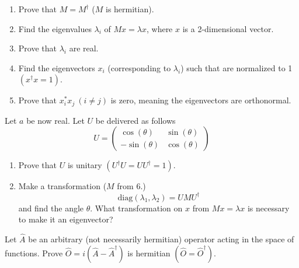 \documentclass[11pt,letterpaper]{article}%
\begin{document}
\begin{enumerate}[label=\Large{\textbf{\arabic*.}}]
{\begin{enumerate}[label=\textit{\roman*.}]
\item{
Prove that $M = M^\dag$ ($M$ is hermitian).
}

\item{
Find the eigenvalues $\lambda_i$ of $Mx=\lambda x$, where $x$ is a 2-dimensional vector.
}

\item{
Prove that $\lambda_i$ are real.
}

\item{
Find the eigenvectors $x_i$ (corresponding to $\lambda_i$) such that are normalized to 1 $(x^\dag 
x = 1)$.
}

\item{
Prove that $x_i^*x_j\ (i\neq j)$ is zero, meaning the eigenvectors are orthonormal.
}

\end{enumerate}

\item{
Let $a$ be now real. Let $U$ be delivered as follows
\begin{equation}
\label{U}
U =
\begin{pmatrix}
\cos(\theta) & \sin(\theta)\\
-\sin(\theta) & \cos(\theta)
\end{pmatrix}
\end{equation}

\begin{enumerate}[label=\textit{\roman*.}]
\item{
Prove that $U$ is unitary $(U^\dag U = UU^\dag = 1)$.
}

\item{
Make a transformation ($M$ from 6.)
\begin{equation}
\label{transform}
\text{diag}(\lambda_1,\lambda_2) = UMU^\dag
\end{equation}
and find the angle $\theta$. What transformation on $x$ from $Mx=\lambda x$ is necessary to make it an eigenvector?
}
\end{enumerate}
}

\item{
Let $\hat{A}$ be an arbitrary (not necessarily hermitian) operator acting in the space of functions. Prove $\hat{O} = i(\hat{A} - \hat{A}^\dag)$ is hermitian $(\hat{O}=\hat{O}^\dag)$.
}

}


\end{enumerate}
\end{document}
